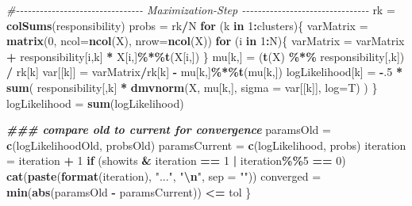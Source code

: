 \documentclass[
]{article}
\newenvironment{Shaded}{\begin{snugshade}}{\end{snugshade}}
\newcommand{\AttributeTok}[1]{\textcolor[rgb]{0.13,0.29,0.53}{#1}}
\newcommand{\CommentTok}[1]{\textcolor[rgb]{0.56,0.35,0.01}{\textit{#1}}}
\newcommand{\ControlFlowTok}[1]{\textcolor[rgb]{0.13,0.29,0.53}{\textbf{#1}}}
\newcommand{\DecValTok}[1]{\textcolor[rgb]{0.00,0.00,0.81}{#1}}
\newcommand{\DocumentationTok}[1]{\textcolor[rgb]{0.56,0.35,0.01}{\textbf{\textit{#1}}}}
\newcommand{\FunctionTok}[1]{\textcolor[rgb]{0.13,0.29,0.53}{\textbf{#1}}}
\newcommand{\NormalTok}[1]{#1}
\newcommand{\OtherTok}[1]{\textcolor[rgb]{0.56,0.35,0.01}{#1}}
\newcommand{\SpecialCharTok}[1]{\textcolor[rgb]{0.81,0.36,0.00}{\textbf{#1}}}
\newcommand{\StringTok}[1]{\textcolor[rgb]{0.31,0.60,0.02}{#1}}
\begin{document}
\begin{Shaded}
\begin{Highlighting}[]
\CommentTok{\#{-}{-}{-}{-}{-}{-}{-}{-}{-}{-}{-}{-}{-}{-}{-}{-}{-}{-}{-}{-}{-}{-}{-}{-}{-}{-}{-}{-}{-}{-}{-}{-} Maximization{-}Step {-}{-}{-}{-}{-}{-}{-}{-}{-}{-}{-}{-}{-}{-}{-}{-}{-}{-}{-}{-}{-}{-}{-}{-}{-}{-}{-}{-}{-}{-}{-}{-}}
\NormalTok{    rk }\OtherTok{=} \FunctionTok{colSums}\NormalTok{(responsibility)}
\NormalTok{    probs }\OtherTok{=}\NormalTok{ rk}\SpecialCharTok{/}\NormalTok{N}
    \ControlFlowTok{for}\NormalTok{ (k }\ControlFlowTok{in} \DecValTok{1}\SpecialCharTok{:}\NormalTok{clusters)\{}
\NormalTok{      varMatrix }\OtherTok{=} \FunctionTok{matrix}\NormalTok{(}\DecValTok{0}\NormalTok{, }\AttributeTok{ncol=}\FunctionTok{ncol}\NormalTok{(X), }\AttributeTok{nrow=}\FunctionTok{ncol}\NormalTok{(X))}
      \ControlFlowTok{for}\NormalTok{ (i }\ControlFlowTok{in} \DecValTok{1}\SpecialCharTok{:}\NormalTok{N)\{}
\NormalTok{        varMatrix }\OtherTok{=}\NormalTok{ varMatrix }\SpecialCharTok{+}\NormalTok{ responsibility[i,k] }\SpecialCharTok{*}\NormalTok{ X[i,]}\SpecialCharTok{\%*\%}\FunctionTok{t}\NormalTok{(X[i,])}
\NormalTok{      \}}
\NormalTok{      mu[k,] }\OtherTok{=}\NormalTok{ (}\FunctionTok{t}\NormalTok{(X) }\SpecialCharTok{\%*\%}\NormalTok{ responsibility[,k]) }\SpecialCharTok{/}\NormalTok{ rk[k]}
\NormalTok{      var[[k]] }\OtherTok{=}\NormalTok{  varMatrix}\SpecialCharTok{/}\NormalTok{rk[k] }\SpecialCharTok{{-}}\NormalTok{ mu[k,]}\SpecialCharTok{\%*\%}\FunctionTok{t}\NormalTok{(mu[k,])}
\NormalTok{      logLikelihood[k] }\OtherTok{=} \SpecialCharTok{{-}}\NormalTok{.}\DecValTok{5} \SpecialCharTok{*} \FunctionTok{sum}\NormalTok{( responsibility[,k] }\SpecialCharTok{*} \FunctionTok{dmvnorm}\NormalTok{(X, mu[k,], }\AttributeTok{sigma =}\NormalTok{ var[[k]], }\AttributeTok{log=}\NormalTok{T) )}
\NormalTok{    \}}
\NormalTok{    logLikelihood }\OtherTok{=} \FunctionTok{sum}\NormalTok{(logLikelihood)}
    
    \DocumentationTok{\#\#\# compare old to current for convergence}
\NormalTok{    paramsOld }\OtherTok{=}  \FunctionTok{c}\NormalTok{(logLikelihoodOld, probsOld)}
\NormalTok{    paramsCurrent }\OtherTok{=} \FunctionTok{c}\NormalTok{(logLikelihood, probs)}
\NormalTok{    iteration }\OtherTok{=}\NormalTok{ iteration }\SpecialCharTok{+} \DecValTok{1}
    \ControlFlowTok{if}\NormalTok{ (showits }\SpecialCharTok{\&}\NormalTok{ iteration }\SpecialCharTok{==} \DecValTok{1} \SpecialCharTok{|}\NormalTok{ iteration}\SpecialCharTok{\%\%}\DecValTok{5} \SpecialCharTok{==} \DecValTok{0}\NormalTok{)}
      \FunctionTok{cat}\NormalTok{(}\FunctionTok{paste}\NormalTok{(}\FunctionTok{format}\NormalTok{(iteration), }\StringTok{"..."}\NormalTok{, }\StringTok{"}\SpecialCharTok{\textbackslash{}n}\StringTok{"}\NormalTok{, }\AttributeTok{sep =} \StringTok{""}\NormalTok{))}
\NormalTok{    converged }\OtherTok{=} \FunctionTok{min}\NormalTok{(}\FunctionTok{abs}\NormalTok{(paramsOld }\SpecialCharTok{{-}}\NormalTok{ paramsCurrent)) }\SpecialCharTok{\textless{}=}\NormalTok{ tol}
\NormalTok{  \}}
  

\end{Highlighting}
\end{Shaded}
\end{document}
